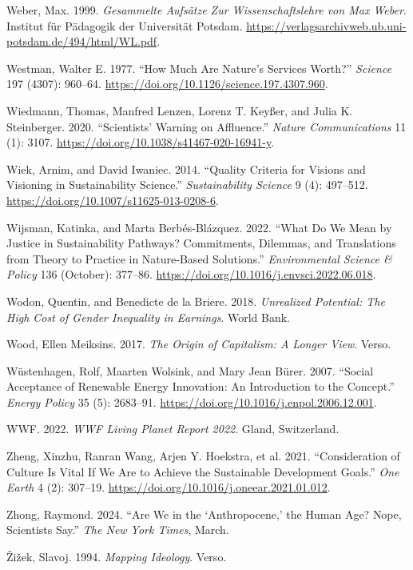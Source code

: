 \documentclass[
  a4paper,
  DIV=11,
  numbers=noendperiod,
  oneside,
  openany]{scrreprt}
\newlength{\cslhangindent}
\newenvironment{CSLReferences}[2] %
 {\begin{list}{}{%
  \setlength{\itemindent}{0pt}
  \setlength{\leftmargin}{0pt}
  \setlength{\parsep}{0pt}
  \ifodd #1
   \setlength{\leftmargin}{\cslhangindent}
   \setlength{\itemindent}{-1\cslhangindent}
  \fi
  \setlength{\itemsep}{#2\baselineskip}}}
 {\end{list}}
\begin{document}
\begin{CSLReferences}{1}{1}
Weber, Max. 1999. \emph{Gesammelte {Aufsätze} Zur {Wissenschaftslehre}
von {Max} {Weber}}. Institut für Pädagogik der Universität Potsdam.
\url{https://verlagsarchivweb.ub.uni-potsdam.de/494/html/WL.pdf}.

Westman, Walter E. 1977. {``How {Much Are Nature}'s {Services Worth}?''}
\emph{Science} 197 (4307): 960--64.
\url{https://doi.org/10.1126/science.197.4307.960}.

Wiedmann, Thomas, Manfred Lenzen, Lorenz T. Keyßer, and Julia K.
Steinberger. 2020. {``Scientists' Warning on Affluence.''} \emph{Nature
Communications} 11 (1): 3107.
\url{https://doi.org/10.1038/s41467-020-16941-y}.

Wiek, Arnim, and David Iwaniec. 2014. {``Quality Criteria for Visions
and Visioning in Sustainability Science.''} \emph{Sustainability
Science} 9 (4): 497--512.
\url{https://doi.org/10.1007/s11625-013-0208-6}.

Wijsman, Katinka, and Marta Berbés-Blázquez. 2022. {``What Do We Mean by
Justice in Sustainability Pathways? {Commitments}, Dilemmas, and
Translations from Theory to Practice in Nature-Based Solutions.''}
\emph{Environmental Science \& Policy} 136 (October): 377--86.
\url{https://doi.org/10.1016/j.envsci.2022.06.018}.

{Wodon, Quentin, and Benedicte de la Briere}. 2018. \emph{Unrealized
Potential: {The} High Cost of Gender Inequality in Earnings}. World
Bank.

Wood, Ellen Meiksins. 2017. \emph{The Origin of Capitalism: A Longer
View}. Verso.

Wüstenhagen, Rolf, Maarten Wolsink, and Mary Jean Bürer. 2007. {``Social
Acceptance of Renewable Energy Innovation: {An} Introduction to the
Concept.''} \emph{Energy Policy} 35 (5): 2683--91.
\url{https://doi.org/10.1016/j.enpol.2006.12.001}.

WWF. 2022. \emph{{WWF Living Planet Report} 2022}. Gland, Switzerland.

Zheng, Xinzhu, Ranran Wang, Arjen Y. Hoekstra, et al. 2021.
{``Consideration of Culture Is Vital If We Are to Achieve the
{Sustainable Development Goals}.''} \emph{One Earth} 4 (2): 307--19.
\url{https://doi.org/10.1016/j.oneear.2021.01.012}.

Zhong, Raymond. 2024. {``Are {We} in the {`{Anthropocene},'} the {Human
Age}? {Nope}, {Scientists Say}.''} \emph{The New York Times}, March.

Žižek, Slavoj. 1994. \emph{Mapping {Ideology}}. Verso.

\end{CSLReferences}
\end{document}
